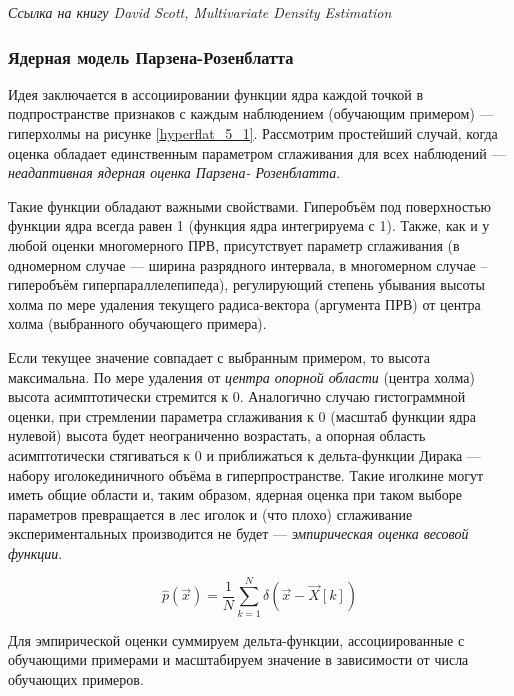 \documentclass[a4paper]{article}
\numberwithin{equation}{subsection}
\begin{document}
\begin{myquote}
    \textit{Ссылка на книгу David Scott, Multivariate Density Estimation}
\end{myquote}




\subsubsection{Ядерная модель Парзена-Розенблатта}

Идея заключается в ассоциировании функции ядра каждой точкой в подпространстве 
признаков с каждым наблюдением (обучающим примером) --- \glqq гиперхолмы\grqq 
на рисунке \ref{hyperflat_5_1}.
Рассмотрим простейший случай, когда оценка обладает единственным параметром 
сглаживания для всех наблюдений --- \textit{неадаптивная ядерная оценка Парзена-
Розенблатта}.

Такие функции обладают важными свойствами.
Гиперобъём под поверхностью функции ядра всегда равен 1 (функция ядра интегрируема с 1).
Также, как и у любой оценки многомерного ПРВ, присутствует параметр сглаживания
(в одномерном случае --- ширина разрядного интервала,
в многомерном случае -- гиперобъём гиперпараллелепипеда), регулирующий степень 
убывания высоты холма по мере удаления текущего радиса-вектора (аргумента ПРВ)
от центра холма (выбранного обучающего примера). 

Если текущее значение совпадает с выбранным примером, то высота максимальна. 
По мере удаления от \textit{центра опорной области} (центра холма) высота асимптотически
стремится к $0$. Аналогично случаю гистограммной оценки, при стремлении параметра 
сглаживания к 0 (масштаб функции ядра нулевой) высота будет неограниченно возрастать,
а опорная область асимптотически стягиваться к 0 и приближаться к дельта-функции 
Дирака --- набору \glqq иголок\grqq единичного объёма в гиперпространстве.
Такие \glqq иголки\grqq не могут иметь общие области и, таким образом, 
ядерная оценка при таком выборе параметров превращается в \glqq лес иголок\grqq 
и (что плохо) сглаживание экспериментальных производится не будет
 --- \textit{эмпирическая оценка весовой функции}.

\begin{equation}
    \hat{p}(\vec{x}) = \dfrac{1}{N} \sum_{k=1}^{N} \delta(\vec{x} - \vec{X}[k])
    \label{eq:empirical_weight_func}
\end{equation}

Для эмпирической оценки суммируем дельта-функции, ассоциированные с обучающими примерами
и масштабируем значение в зависимости от числа обучающих примеров.
\end{document}
